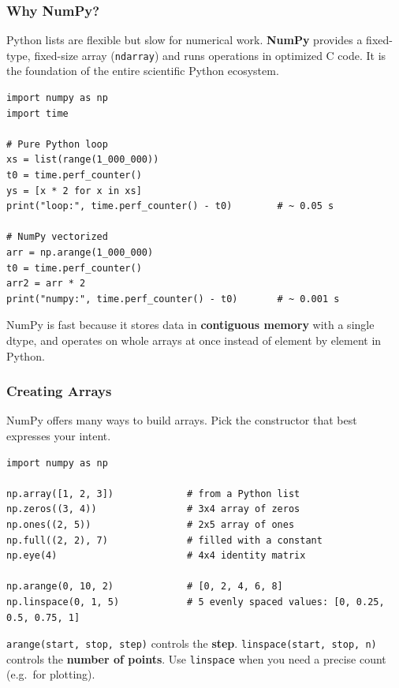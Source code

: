 \documentclass[aspectratio=169,10pt]{beamer}
\newcommand{\keyword}[1]{\textcolor{PrimaryBlue}{\textbf{#1}}}
\newcommand{\codeword}[1]{\texttt{#1}}
\newenvironment{bluebox}[1]{%
  \vspace{0.08cm}\begin{tcolorbox}[lecturebox,title={#1},fontupper=\small]%
}{\end{tcolorbox}\vspace{0.05cm}}
\begin{document}
\begin{frame}[fragile]
\frametitle{Why NumPy?}
\small
Python lists are flexible but slow for numerical work. \keyword{NumPy} provides a fixed-type, fixed-size array (\codeword{ndarray}) and runs operations in optimized C code. It is the foundation of the entire scientific Python ecosystem.

\vspace{0.15cm}
\begin{lstlisting}[style=pycode]
import numpy as np
import time

# Pure Python loop
xs = list(range(1_000_000))
t0 = time.perf_counter()
ys = [x * 2 for x in xs]
print("loop:", time.perf_counter() - t0)        # ~ 0.05 s

# NumPy vectorized
arr = np.arange(1_000_000)
t0 = time.perf_counter()
arr2 = arr * 2
print("numpy:", time.perf_counter() - t0)       # ~ 0.001 s
\end{lstlisting}

\begin{tcolorbox}[lecturebox,title=Key idea]
NumPy is fast because it stores data in \keyword{contiguous memory} with a single dtype, and operates on whole arrays at once instead of element by element in Python.
\end{tcolorbox}
\end{frame}


\begin{frame}[fragile]
\frametitle{Creating Arrays}
\small
NumPy offers many ways to build arrays. Pick the constructor that best expresses your intent.

\vspace{0.12cm}
\begin{lstlisting}[style=pycode]
import numpy as np

np.array([1, 2, 3])             # from a Python list
np.zeros((3, 4))                # 3x4 array of zeros
np.ones((2, 5))                 # 2x5 array of ones
np.full((2, 2), 7)              # filled with a constant
np.eye(4)                       # 4x4 identity matrix

np.arange(0, 10, 2)             # [0, 2, 4, 6, 8]
np.linspace(0, 1, 5)            # 5 evenly spaced values: [0, 0.25, 0.5, 0.75, 1]
\end{lstlisting}

\begin{bluebox}{arange vs.\ linspace}
\codeword{arange(start, stop, step)} controls the \keyword{step}. \codeword{linspace(start, stop, n)} controls the \keyword{number of points}. Use \codeword{linspace} when you need a precise count (e.g.\ for plotting).
\end{bluebox}
\end{frame}
\end{document}
